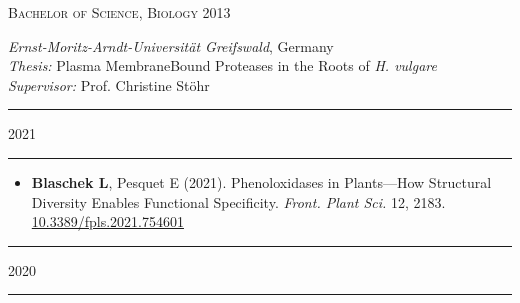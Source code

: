 \documentclass[11pt]{article}
\newcommand*{\xdash}[1][3em]{\rule[0.5ex]{#1}{0.55pt}}
\begin{document}
\textsc{\large{Bachelor of Science, Biology} \hfill \textsc{2013}}
\begin{addmargin}[24pt]{0pt}
	\textit{Ernst-Moritz-Arndt-Universität Greifswald}, Germany \\
	\textit{Thesis:} Plasma Membrane\textendash Bound Proteases in the Roots of \textit{H. vulgare}\\
	\textit{Supervisor:} Prof. Christine Stöhr
	\vspace{0.1cm} \\
\end{addmargin}
\vspace{0.5cm}


\hspace*{\fill} \xdash[6em] \large{\textsc{2021}} \xdash[6em] \hspace*{\fill} \normalsize

\vspace{-0.175cm}	
\begin{itemize}[label={},itemindent=-9pt,leftmargin=24pt]
	\itemsep-0.1cm
	\item \textbf{Blaschek L}, Pesquet E (2021). Phenoloxidases in Plants—How Structural Diversity Enables Functional Specificity. \textit{Front. Plant Sci.} 12, 2183.
	\href{https://doi.org/10.3389/fpls.2021.754601}{10.3389/fpls.2021.754601}
\end{itemize}


\hspace*{\fill} \xdash[6em] \large{\textsc{2020}} \xdash[6em] \hspace*{\fill} \normalsize
\end{document}
